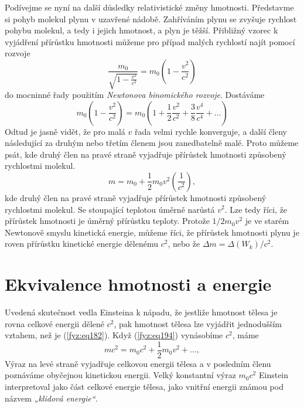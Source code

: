     Podívejme se nyní na další důsledky relativistické změny hmotnosti. Představme si pohyb molekul 
    plynu v uzavřené nádobě. Zahříváním plynu se zvyšuje rychlost pohybu molekul, a tedy i jejich 
    hmotnost, a plyn je těžší. Přibližný vzorec k vyjádření přírůstku hmotnosti můžeme pro případ 
    malých rychlostí najít pomocí rozvoje
    \begin{equation*}
      \frac{m_0}{\sqrt{1-\frac{v^2}{c^2}}} = m_0\left(1-\frac{v^2}{c^2}\right)
    \end{equation*}
    do mocninné řady použitím \emph{Newtonova binomického rozvoje}.
    Dostáváme
    \begin{equation*}
      m_0\left(1-\frac{v^2}{c^2}\right) 
        = m_0\left(1 + \frac{1}{2}\frac{v^2}{c^2} + 
                       \frac{3}{8}\frac{v^4}{c^4} + \ldots \right)
    \end{equation*}
    Odtud je jasně vidět, že pro malá \(v\) řada velmi rychle konverguje, a další členy následující 
    za druhým nebo třetím členem jsou zanedbatelně malé. Proto můžeme psát, kde druhý člen na pravé 
    straně vyjadřuje přírůstek hmotnosti způsobený rychlostmi molekul. 
    \begin{equation}\label{fyz:eq194}
      m = m_0 + \frac{1}{2}m_0v^2\left(\frac{1}{c^2}\right),
    \end{equation}
    kde druhý člen na pravé straně vyjadřuje přírůstek hmotnosti způsobený rychlostmi molekul. Se 
    stoupající teplotou úměrně narůstá \(v^2\). Lze tedy říci, že přírůstek hmotnosti je úměrný 
    přírůstku teploty. Protože \(1/2m_0v^2\) je ve starém Newtonově smyslu kinetická energie, 
    můžeme říci, že přírůstek hmotnosti plynu je roven přírůstku kinetické energie dělenému 
    \(c^2\), nebo že \(\Delta m = \Delta(W_k)/c^2\).
    
  \section{Ekvivalence hmotnosti a energie}\label{fyz:IchapXVsecXI}
    Uvedená skutečnost vedla Einsteina k nápadu, že jestliže hmotnost tělesa je rovna celkové 
    energii dělené \(c^2\), pak hmotnost tělesa lze vyjádřit jednodušším vztahem, než je 
    (\ref{fyz:eq182}). Když (\ref{fyz:eq194}) vynásobíme \(c^2\), máme
    \begin{equation}\label{fyz:eq195}
      mc^2 = m_0c^2 + \frac{1}{2}m_0v^2 + \ldots,
    \end{equation}
    Výraz na levé straně vyjadřuje celkovou energii tělesa a v posledním členu poznáváme obyčejnou 
    kinetickou energii. Velký konstantní výraz \(m_0c^2\) Einstein interpretoval jako část celkové 
    energie tělesa, jako vnitřní energii známou pod názvem \emph{„klidová energie“}.
    
